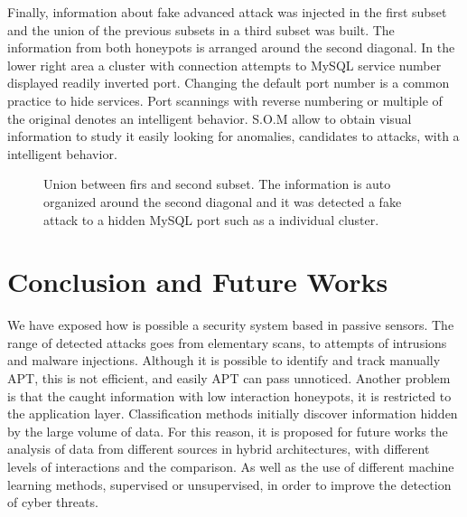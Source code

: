\documentclass[a4paper]{llncs}
\begin{document}
Finally, information about fake advanced attack was injected in the first subset and the union of the previous subsets in a third subset was built. The information from both honeypots is arranged around the second diagonal. In the lower right area a cluster with connection attempts to MySQL service number displayed readily inverted port. Changing the default port number is a common practice to hide services. Port scannings with reverse numbering or multiple of the original denotes an intelligent behavior. S.O.M allow to obtain visual information to study it easily looking for  anomalies, candidates to attacks, with a intelligent behavior.

\begin{figure}[h]
	\label{fig:internalTypes}
	\caption{Union between firs and second subset. The information is auto organized around the second diagonal and it was detected a fake attack to a hidden MySQL port such as a individual cluster.}
\end{figure}

\section{Conclusion and Future Works}
\label{sec:conclusion&future}
We have exposed how is possible a security system based in passive sensors. The range of detected attacks goes from elementary scans, to attempts of intrusions and malware injections. Although it is possible to identify and track manually APT, this is not efficient, and easily APT can pass unnoticed. Another problem is that the caught information with low interaction honeypots, it is restricted to the application layer. Classification methods initially discover information hidden by the large volume of data. 
For this reason, it is proposed for future works the analysis of data from different sources in hybrid architectures, with different levels of interactions and the comparison. As well as the use of different machine learning methods, supervised or unsupervised, in order to improve the detection of cyber threats.



\end{document}
